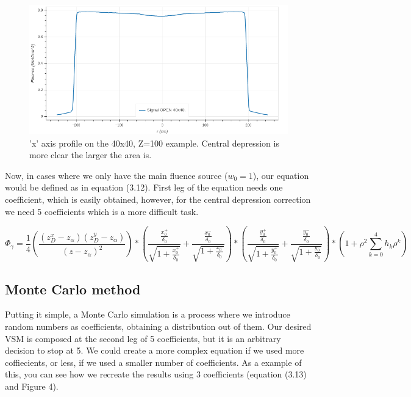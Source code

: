 \documentclass[openany]{article}
\begin{document}
\begin{figure}[!h]
    \centering
    \includegraphics[width=\textwidth]{Central_Depression.png}
    \caption{'x' axis profile on the 40x40, Z=100 example. Central depression is more clear the larger the area is.}
    \label{fig:my_label}
\end{figure}




Now, in cases where we only have the main fluence source (\(w_0 = 1\)), our equation would be defined as in equation (3.12). First leg of the equation needs one coefficient, which is easily obtained, however, for the central depression correction we need 5 coefficients which is a more difficult task.

\begin{equation}
    \Phi_\gamma = \frac{1}{4} (\frac{(z_D^x - z_\alpha) (z^y_D - z_\alpha )}{(z-z_\alpha)^2})*(\frac{\frac{x_0^+}{\delta_0}}{\sqrt{1+\frac{x_0^+}{\delta_0}}} + \frac{\frac{x_0^-}{\delta_0}}{\sqrt{1+\frac{x_0^-}{\delta_0}}}) * (\frac{\frac{y_0^+}{\delta_0}}{\sqrt{1+\frac{y_0^+}{\delta_0}}} + \frac{\frac{y_0^-}{\delta_0}}{\sqrt{1+\frac{y_0^-}{\delta_0}}}) * ( 1+ \rho^2 \sum_{k=0}^4 h_k \rho^k)
\end{equation}




\subsection{Monte Carlo method}

Putting it simple, a Monte Carlo simulation \cite{Kroese2014WhyTM} is a process where we introduce random numbers as coefficients, obtaining a distribution out of them. Our desired VSM is composed at the second leg of 5 coefficients, but it is an arbitrary decision to stop at 5. We could create a more complex equation if we used more coffiecients, or less, if we used a smaller number of coefficients. As a example of this, you can see how we recreate the results using 3 coefficients (equation (3.13) and Figure 4). \\
\end{document}
